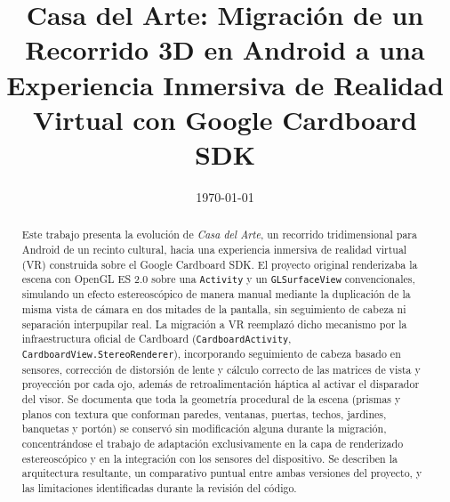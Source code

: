 \documentclass[conference]{IEEEtran}
\date{\specialdate\today}
\begin{document}
	
	\newcommand{\breite}{1.0} %
	\newcommand{\RelacionFiguradoscolumnas}{0.9}
	\newcommand{\RelacionFiguradoscolumnasPuntoCinco}{0.45}
	
	
	\title{Casa del Arte: Migración de un Recorrido 3D en Android a una Experiencia Inmersiva de Realidad Virtual con Google Cardboard SDK}
	
	\author{
	}
	
	\maketitle
	
	\begin{abstract}
		Este trabajo presenta la evolución de \textit{Casa del Arte}, un recorrido tridimensional para Android de un recinto cultural, hacia una experiencia inmersiva de realidad virtual (VR) construida sobre el Google Cardboard SDK. El proyecto original renderizaba la escena con OpenGL ES 2.0 sobre una \texttt{Activity} y un \texttt{GLSurfaceView} convencionales, simulando un efecto estereoscópico de manera manual mediante la duplicación de la misma vista de cámara en dos mitades de la pantalla, sin seguimiento de cabeza ni separación interpupilar real. La migración a VR reemplazó dicho mecanismo por la infraestructura oficial de Cardboard (\texttt{CardboardActivity}, \texttt{CardboardView.StereoRenderer}), incorporando seguimiento de cabeza basado en sensores, corrección de distorsión de lente y cálculo correcto de las matrices de vista y proyección por cada ojo, además de retroalimentación háptica al activar el disparador del visor. Se documenta que toda la geometría procedural de la escena (prismas y planos con textura que conforman paredes, ventanas, puertas, techos, jardines, banquetas y portón) se conservó sin modificación alguna durante la migración, concentrándose el trabajo de adaptación exclusivamente en la capa de renderizado estereoscópico y en la integración con los sensores del dispositivo. Se describen la arquitectura resultante, un comparativo puntual entre ambas versiones del proyecto, y las limitaciones identificadas durante la revisión del código.
	\end{abstract}
	
\end{document}
